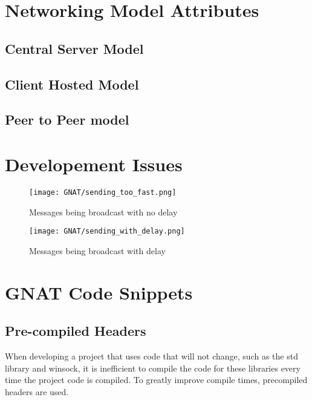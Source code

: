 \chapter{Networking Model Attributes}\label{app:attributes}

\section{Central Server Model}

\newpage

\section{Client Hosted Model}

\newpage

\section{Peer to Peer model}


\chapter{Developement Issues}
\begin{figure}[!h]
  \centering
  \texttt{[image: GNAT/sending\_too\_fast.png]}
  \caption{Messages being broadcast with no delay}
  \label{fig:broadcast_too_fast}
\end{figure}

\begin{figure}[!h]
  \centering
  \texttt{[image: GNAT/sending\_with\_delay.png]}
  \caption{Messages being broadcast with delay}
  \label{fig:broadcast_with_delay}
\end{figure}

\chapter{GNAT Code Snippets}

\section{Pre-compiled Headers}
When developing a project that uses code that will not change, such as the std library and winsock, it is inefficient to compile the code for these libraries every time the project code is compiled. To greatly improve compile times, precompiled headers are used.

